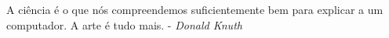 \renewcommand{\epigraphname}{EPÍGRAFE}
\begin{epigrafe}
A ciência é o que nós compreendemos suficientemente bem
para explicar a um computador. A arte é tudo mais. - \textit{Donald Knuth}
\end{epigrafe}
